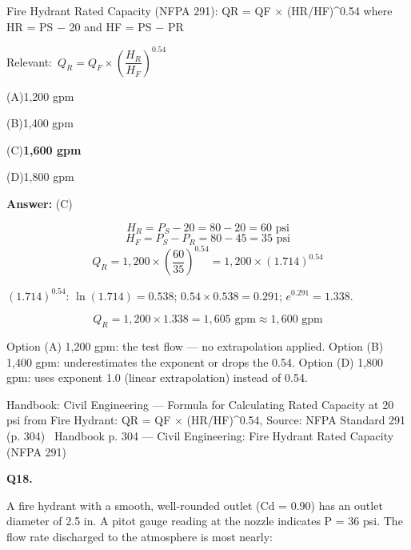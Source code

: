 \documentclass[11pt]{article}
\newcommand{\correct}[1]{\textbf{#1}\;{\color{accent}$\checkmark$}}
\newcommand{\optline}[2]{\par\noindent\hspace{1.2em}(#1)\hspace{0.6em}#2}
\begin{document}
Fire Hydrant Rated Capacity (NFPA 291):
QR = QF $\times$ (HR/HF)\textasciicircum{}0.54
where HR = PS $-$ 20 and HF = PS $-$ PR\par\vspace{3pt}
{\small\color{soft}Relevant:}\ $Q_R = Q_F \times \left(\dfrac{H_R}{H_F}\right)^{0.54}$\par\vspace{3pt}
\optline{A}{1,200 gpm}
\optline{B}{1,400 gpm}
\optline{C}{\correct{1,600 gpm}}
\optline{D}{1,800 gpm}
\par\vspace{3pt}
\vspace{2pt}\par\noindent\colorbox{boxbg}{\parbox{\dimexpr\linewidth-2\fboxsep\relax}{%
\vspace{2pt}\textbf{Answer:} (C)\par\vspace{2pt}
{\small \[H_R = P_S - 20 = 80 - 20 = 60\text{ psi}\]
\[H_F = P_S - P_R = 80 - 45 = 35\text{ psi}\]
\[Q_R = 1{,}200 \times \left(\frac{60}{35}\right)^{0.54} = 1{,}200 \times (1.714)^{0.54}\]

$(1.714)^{0.54}$: $\ln(1.714) = 0.538$; $0.54 \times 0.538 = 0.291$; $e^{0.291} = 1.338$.

\[Q_R = 1{,}200 \times 1.338 = 1{,}605\text{ gpm} \approx 1{,}600\text{ gpm}\]

Option (A) 1,200 gpm: the test flow --- no extrapolation applied. Option (B) 1,400 gpm: underestimates the exponent or drops the 0.54. Option (D) 1,800 gpm: uses exponent 1.0 (linear extrapolation) instead of 0.54.}\par\vspace{2pt}
{\footnotesize\color{soft}Handbook: Civil Engineering --- Formula for Calculating Rated Capacity at 20 psi from Fire Hydrant: QR = QF $\times$ (HR/HF)\textasciicircum{}0.54, Source: NFPA Standard 291 (p. 304) \textbullet\ Handbook p. 304 --- Civil Engineering: Fire Hydrant Rated Capacity (NFPA 291)}\vspace{2pt}
}}
\vspace{9pt}
\filbreak
\textbf{\color{accent}Q18.}\par\vspace{2pt}
A fire hydrant with a smooth, well-rounded outlet (Cd = 0.90) has an outlet diameter of 2.5 in. A pitot gauge reading at the nozzle indicates P = 36 psi. The flow rate discharged to the atmosphere is most nearly:
\end{document}

